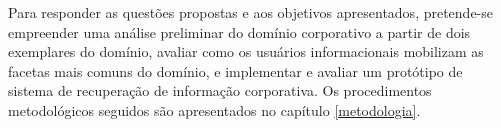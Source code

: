Para responder as questões propostas e aos objetivos apresentados, pretende-se empreender uma análise preliminar do domínio corporativo a partir de dois exemplares do domínio, avaliar como os usuários informacionais mobilizam as facetas mais comuns do domínio, e implementar e avaliar um protótipo de sistema de recuperação de informação corporativa. Os procedimentos metodológicos seguidos são apresentados no capítulo \ref{metodologia}.

















